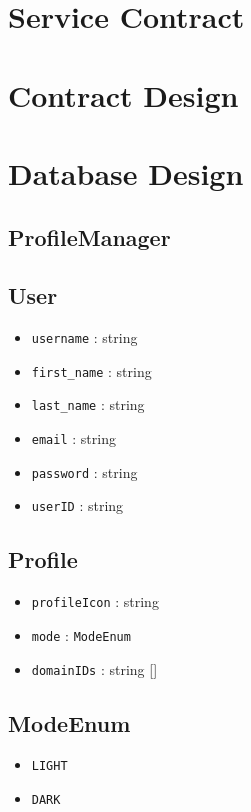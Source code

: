 \documentclass[12pt]{article}
\begin{document}
\newpage

\section{Service Contract}

\newpage

\section{Contract Design}

\newpage

\section{Database Design}

\subsection{ProfileManager}

\subsection{User}
\begin{itemize}
  \item \texttt{username} : string
  \item \texttt{first\_name} : string
  \item \texttt{last\_name} : string
  \item \texttt{email} : string
  \item \texttt{password} : string
  \item \texttt{userID} : string
\end{itemize}

\subsection{Profile}
\begin{itemize}
  \item \texttt{profileIcon} : string
  \item \texttt{mode} : \texttt{ModeEnum}
  \item \texttt{domainIDs} : string []
\end{itemize}

\subsection{ModeEnum}
\begin{itemize}
  \item \texttt{LIGHT}
  \item \texttt{DARK}
\end{itemize}
\end{document}
